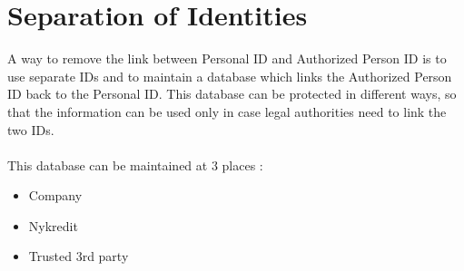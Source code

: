 \section{Separation of Identities}
A way to remove the link between Personal ID and Authorized Person ID is to use separate IDs and to maintain a database which links the Authorized Person ID back to the Personal ID. This database can be protected in different ways, so that the information can be used only in case legal authorities need to link the two IDs.
\\
\\This database can be maintained at 3 places :
\begin{itemize}
	\item Company 
	\item Nykredit
	\item Trusted 3rd party
\end{itemize}
